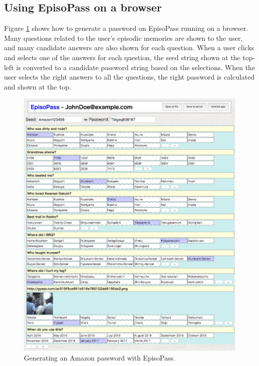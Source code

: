 \documentclass[runningheads,a4paper]{llncs}
\begin{document}
\subsection{Using EpisoPass on a browser}

Figure \ref{web1} shows how to generate a password
on EpisoPass running on a browser.
Many questions related to the user's episodic memories are shown to the user,
and many candidate answers are also shown for each question.
When a user clicks and selects one of the answers for each question,
the seed string shown at the top-left is converted to a
candidate password string based on the selections.
When the user selects the right answers to all the questions,
the right password is calculated and shown at the top.


\begin{figure}[H]
\centering
\includegraphics[width=1.0\columnwidth]{figures/4d13e6804ba790624c1f8e2b8255bde5}
\caption{Generating an Amazon password with EpisoPass.}
\label{web1}
\end{figure}
\end{document}
